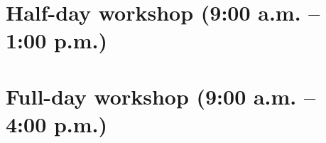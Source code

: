 \documentclass{report}
\begin{document}
        
        
        
        
    \newpage
    \chapter*{ Half-day workshop (9:00 a.m. – 1:00 p.m.) }

      
        
        
        
        
        
        
        
        
        
        
        
    \newpage
    \chapter*{ Full-day workshop (9:00 a.m. – 4:00 p.m.) }

      
        
        
        
\end{document}
